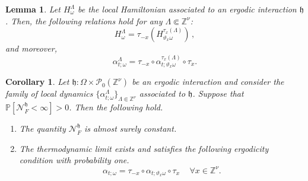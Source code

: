 \documentclass{article}
\newcommand{\calN}{\mathcal{N}^{\mathfrak{h}}_F}
\newcommand{\Znu}{\mathbb{Z}^\nu}
\renewcommand{\P}{\mathbb{P}}
\newcommand{\<}{\langle}
\renewcommand{\>}{\rangle}
\newcommand{\h}{\mathfrak{h}}
\newtheorem{lem}[thm]{Lemma}
\newtheorem{cor}[thm]{Corollary}
\theoremstyle{definition}
\numberwithin{equation}{section}
\begin{document}
\begin{lem}\label{lem:local_covariance}
    Let $H^{\Lambda}_\omega$ be the local Hamiltonian associated to an ergodic interaction $\h$. Then, the following relations hold for any $\Lambda \Subset \Znu$:
        \begin{equation}
            H^{\Lambda}_{\omega} = \tau_{-x}(H^{\tau_x(\Lambda)}_{\vartheta_x \omega})\,,
        \end{equation} and moreover, 
        \begin{equation}
            \alpha^{\Lambda}_{t;\omega} = \tau_{-x} \circ \alpha^{\tau_{x}(\Lambda)}_{t;\vartheta_x \omega} \circ \tau_x. 
        \end{equation} 
\end{lem}


\begin{cor}\label{cor:N-norm_const,thermo_covariance}
    Let $\h:\Omega \times \mathscr{P}_0(\Znu)$ be an ergodic interaction and consider the family of local dynamics $\{\alpha^{\Lambda}_{t;\omega}\}_{\Lambda \Subset \Znu}$ associated to $\h$. Suppose that $\P[\calN<\infty]>0$. Then the following hold. 
    \begin{enumerate}
        \item The quantity $\calN$ is almost surely constant. 
        \item The thermodynamic limit exists and satisfies the following ergodicity condition with probability one.  
                \begin{equation}
                    \alpha_{t;\omega} = \tau_{-x} \circ \alpha _{t;\vartheta_x \omega} \circ \tau_x\, \quad \forall x\in \Znu. 
        \end{equation}  
    \end{enumerate}

\end{cor}
\end{document}
